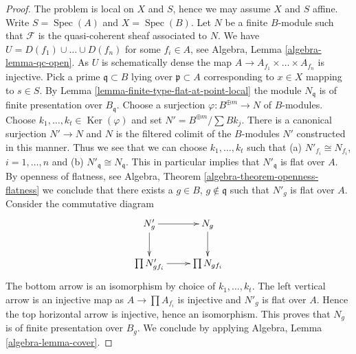 \documentclass[10pt,a4paper]{amsart}
\theoremstyle{plain}
\theoremstyle{definition}
\theoremstyle{remark}
\numberwithin{equation}{subsection}
\def\Spec{\mathop{\mathrm{Spec}}}
\def\Ker{\mathop{\mathrm{Ker}}}
\begin{document}
\begin{proof}
The problem is local on $X$ and $S$, hence we may assume $X$ and $S$ affine.
Write $S = \Spec(A)$ and $X = \Spec(B)$. Let $N$ be a finite $B$-module such
that $\mathcal{F}$ is the quasi-coherent sheaf associated to $N$.
We have $U = D(f_1) \cup \ldots \cup D(f_n)$ for some $f_i \in A$, see
Algebra, Lemma \ref{algebra-lemma-qc-open}.
As $U$ is schematically dense the map
$A \to A_{f_1} \times \ldots \times A_{f_n}$ is injective.
Pick a prime $\mathfrak q \subset B$ lying over $\mathfrak p \subset A$
corresponding to $x \in X$ mapping to $s \in S$.
By Lemma \ref{lemma-finite-type-flat-at-point-local}
the module $N_\mathfrak q$ is of finite presentation over $B_\mathfrak q$.
Choose a surjection $\varphi : B^{\oplus m} \to N$ of $B$-modules.
Choose $k_1, \ldots, k_t \in \Ker(\varphi)$ and
set $N' = B^{\oplus m}/\sum Bk_j$. There is a canonical surjection
$N' \to N$ and $N$ is the filtered colimit of the $B$-modules $N'$
constructed in this manner. Thus we see that we can choose
$k_1, \ldots, k_t$ such that (a) $N'_{f_i} \cong N_{f_i}$, $i = 1, \ldots, n$
and (b) $N'_\mathfrak q \cong N_\mathfrak q$.
This in particular implies that $N'_\mathfrak q$ is flat over $A$.
By openness of flatness, see
Algebra, Theorem \ref{algebra-theorem-openness-flatness}
we conclude that there exists a $g \in B$, $g \not \in \mathfrak q$
such that $N'_g$ is flat over $A$. Consider the commutative diagram
$$
\xymatrix{
N'_g \ar[r] \ar[d] & N_g \ar[d] \\
\prod N'_{gf_i} \ar[r] & \prod N_{gf_i}
}
$$
The bottom arrow is an isomorphism by choice of $k_1, \ldots, k_t$.
The left vertical arrow is an injective map as
$A \to \prod A_{f_i}$ is injective and $N'_g$ is flat over $A$.
Hence the top horizontal arrow is injective, hence an isomorphism.
This proves that $N_g$ is of finite presentation over $B_g$.
We conclude by applying
Algebra, Lemma \ref{algebra-lemma-cover}.
\end{proof}
\end{document}

